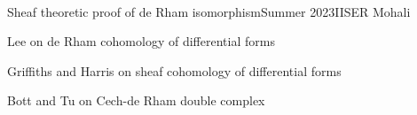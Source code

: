 \documentclass{LoLaTeXcv}
\begin{document}
\






\begin{lltxJob}{Sheaf theoretic proof of de Rham isomorphism}{Summer 2023}{IISER Mohali}
	\item Lee on de Rham cohomology of differential forms
	\item Griffiths and Harris on sheaf cohomology of differential forms
	\item Bott and Tu on Cech-de Rham double complex
\end{lltxJob}
\end{document}
